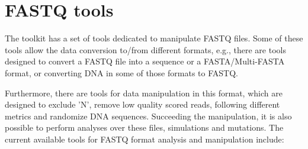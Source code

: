 \chapter{FASTQ tools}
\label{fastq}
The toolkit has a set of tools dedicated to manipulate FASTQ files. Some of these tools allow the data conversion to/from different formats, e.g., there are tools designed to convert a FASTQ file into a sequence or a FASTA/Multi-FASTA format, or converting DNA in some of those formats to FASTQ.

Furthermore, there are tools for data manipulation in this format, which are designed to exclude 'N', remove low quality scored reads, following different metrics and randomize DNA sequences. Succeeding the manipulation, it is also possible to perform analyses over these files, simulations and mutations. The current available tools for FASTQ format analysis and manipulation include:
